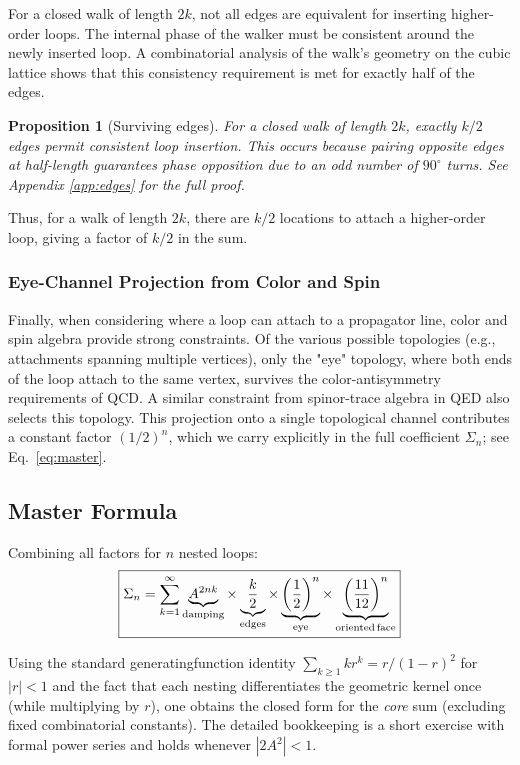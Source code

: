 \documentclass[11pt,a4paper]{article}
\newtheorem{proposition}[theorem]{Proposition}
\theoremstyle{definition}
\theoremstyle{remark}
\begin{document}
For a closed walk of length $2k$, not all edges are equivalent for inserting higher-order loops. The internal phase of the walker must be consistent around the newly inserted loop. A combinatorial analysis of the walk's geometry on the cubic lattice shows that this consistency requirement is met for exactly half of the edges.
\begin{proposition}[Surviving edges]
\label{prop:surviving}
For a closed walk of length $2k$, exactly $k/2$ edges permit consistent loop insertion. This occurs because pairing opposite edges at half-length guarantees phase opposition due to an odd number of $90^\circ$ turns. See Appendix \ref{app:edges} for the full proof.
\end{proposition}
Thus, for a walk of length $2k$, there are $k/2$ locations to attach a higher-order loop, giving a factor of $k/2$ in the sum.

\subsubsection{Eye-Channel Projection from Color and Spin}

Finally, when considering where a loop can attach to a propagator line, color and spin algebra provide strong constraints. Of the various possible topologies (e.g., attachments spanning multiple vertices), only the "eye" topology, where both ends of the loop attach to the same vertex, survives the color-antisymmetry requirements of QCD. A similar constraint from spinor-trace algebra in QED also selects this topology. This projection onto a single topological channel contributes a constant factor $(1/2)^{n}$, which we carry explicitly in the full coefficient $\Sigma_{n}$; see Eq.~\eqref{eq:master}.

\subsection{Master Formula}

Combining all factors for $n$ nested loops:
\begin{equation}
\label{eq:master}
\boxed{\Sigma_n = \sum_{k=1}^{\infty} \underbrace{A^{2nk}}_{\text{damping}} \times \underbrace{\frac{k}{2}}_{\text{edges}} \times \underbrace{\left(\frac{1}{2}\right)^n}_{\text{eye}} \times \underbrace{\left(\frac{11}{12}\right)^n}_{\text{oriented\,face}}}
\end{equation}

\noindent
Using the standard generating\-function identity $\sum_{k\ge1} k r^{k}=r/(1-r)^{2}$ for $|r|<1$ and the fact that each nesting differentiates the geometric kernel once (while multiplying by $r$), one obtains the closed form for the \emph{core} sum (excluding fixed combinatorial constants). The detailed bookkeeping is a short exercise with formal power series and holds whenever $|2A^{2}|<1$.
\end{document}
